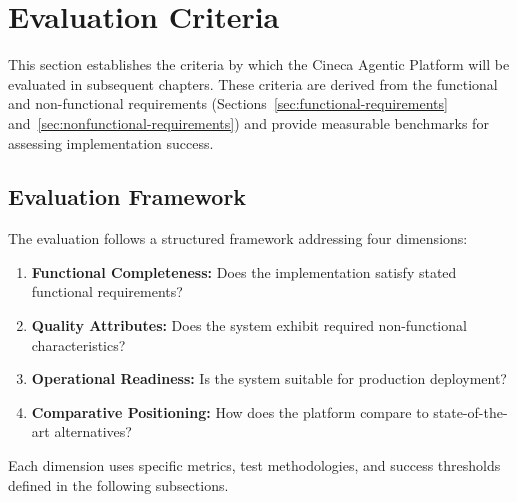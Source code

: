 
\section{Evaluation Criteria}
\label{sec:evaluation-criteria}

This section establishes the criteria by which the Cineca Agentic Platform will be evaluated in subsequent chapters. These criteria are derived from the functional and non-functional requirements (Sections~\ref{sec:functional-requirements} and~\ref{sec:nonfunctional-requirements}) and provide measurable benchmarks for assessing implementation success.

\subsection{Evaluation Framework}
\label{subsec:evaluation-framework}

The evaluation follows a structured framework addressing four dimensions:

\begin{enumerate}
    \item \textbf{Functional Completeness:} Does the implementation satisfy stated functional requirements?
    \item \textbf{Quality Attributes:} Does the system exhibit required non-functional characteristics?
    \item \textbf{Operational Readiness:} Is the system suitable for production deployment?
    \item \textbf{Comparative Positioning:} How does the platform compare to state-of-the-art alternatives?
\end{enumerate}

Each dimension uses specific metrics, test methodologies, and success thresholds defined in the following subsections.

